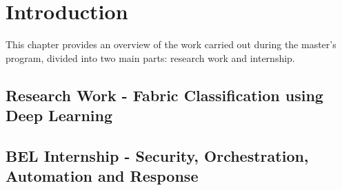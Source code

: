 \chapter{Introduction}

This chapter provides an overview of the work carried out during the master's program, divided into two main parts: research work and internship.

\section{Research Work - Fabric Classification using Deep Learning}

\section{BEL Internship - Security, Orchestration, Automation and Response}
